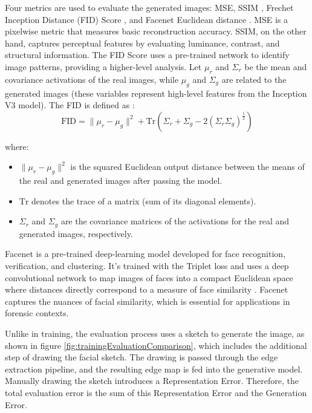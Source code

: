 \documentclass{IEEEcsmag}
\begin{document}
Four metrics are used to evaluate the generated images: MSE, SSIM \cite{wang2004}, Frechet Inception Distance (FID) Score \cite{dowson_frechet_1982}, and Facenet Euclidean distance \cite{schroff_facenet_2015}. MSE is a pixelwise metric that measures basic reconstruction accuracy. SSIM, on the other hand, captures perceptual features by evaluating luminance, contrast, and structural information. The FID Score uses a pre-trained network to identify image patterns, providing a higher-level analysis. Let \(\mu_r\) and \(\Sigma_r\) be the mean and covariance activations of the real images, while \(\mu_g\) and \(\Sigma_g\) are related to the generated images (these variables represent high-level features from the Inception V3 model). The FID is defined as \cite{dowson_frechet_1982}:
\begin{equation}
    \label{eq:FID}
    \text{FID} = \| \mu_r - \mu_g \|^2 + \text{Tr}(\Sigma_r + \Sigma_g - 2 (\Sigma_r \Sigma_g)^{\frac{1}{2}})
\end{equation}

where:
\begin{itemize}
  \item \(\| \mu_r - \mu_g \|^2\) is the squared Euclidean output distance between the means of the real and generated images after passing the model.
  \item \(\text{Tr}\) denotes the trace of a matrix (sum of its diagonal elements).
  \item \(\Sigma_r\) and \(\Sigma_g\) are the covariance matrices of the activations for the real and generated images, respectively.
\end{itemize}

Facenet is a pre-trained deep-learning model developed for face recognition, verification, and clustering. It's trained with the Triplet loss and uses a deep convolutional network to map images of faces into a compact Euclidean space where distances directly correspond to a measure of face similarity \cite{schroff_facenet_2015}. Facenet captures the nuances of facial similarity, which is essential for applications in forensic contexts.

Unlike in training, the evaluation process uses a sketch to generate the image, as shown in figure \ref{fig:trainingEvaluationComparison}, which includes the additional step of drawing the facial sketch. The drawing is passed through the edge extraction pipeline, and the resulting edge map is fed into the generative model. Manually drawing the sketch introduces a Representation Error. Therefore, the total evaluation error is the sum of this Representation Error and the Generation Error.
\end{document}
